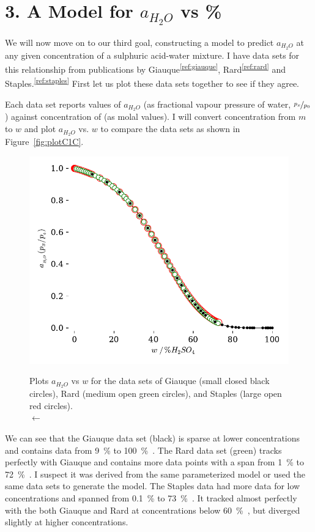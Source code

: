 \documentclass[]{tufte-handout}
\newcommand{\tss}[1]{\textsuperscript{#1}}
\begin{document}

\section{3. A Model for $a_{H_2O}$ vs \%}

We will now move on to our third goal, constructing a model to predict $a_{H_2O}$ at any given concentration of a sulphuric acid-water mixture. I have data sets for this relationship from publications by Giauque\tss{\ref{ref:giauque}}, Rard\tss{\ref{ref:rard}} and Staples.\tss{\ref{ref:staples}} First let us plot these data sets together to see if they agree.

Each data set reports values of $a_{H_2O}$ (as fractional vapour pressure of water, $\nicefrac{p_x}{p_0}$) against concentration of  (as molal values).  I will convert concentration from $m$ to $w$ and plot $a_{H_2O}$ vs. $w$ to compare the data sets as shown in Figure~\vref{fig:plotC1C}.


\begin{figure}
  \centering
  \caption{Plots $a_{H_2O}$ vs $w$ for the data sets of Giauque (small closed black circles), Rard (medium open green circles), and Staples (large open red circles). \vspace{1mm} \\ $\longleftarrow$
}
 \includegraphics[scale=0.75]{images/plot_C1c} 
  \label{fig:plotC1C}
\end{figure}

We can see that the Giauque data set (black) is sparse at lower concentrations and contains data from \qty{9}{\percent} to \qty{100}{\percent{}}. The Rard data set (green) tracks perfectly with Giauque and contains more data points with a span from \qty{1}{\percent} to \qty{72}{\percent{}}. I suspect it was derived from the same parameterized model or used the same data sets to generate the model. The Staples data had more data for low concentrations and spanned from \qty{0.1}{\percent} to \qty{73}{\percent{}}. It tracked almost perfectly with the both Giauque and Rard at concentrations below \qty{60}{\percent{}}, but diverged slightly at higher concentrations.
\end{document}
